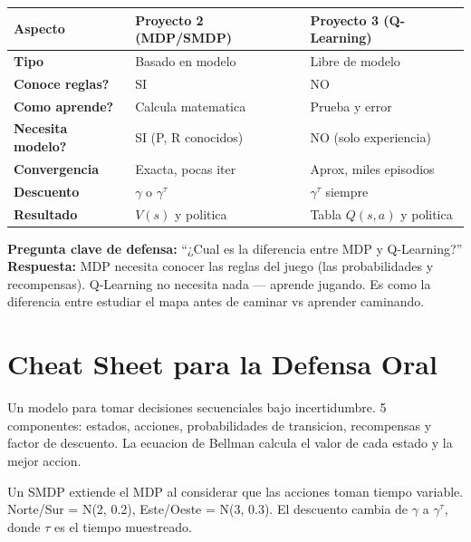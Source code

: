 \documentclass[11pt,a4paper]{article}
\begin{document}
\begin{center}
\begin{tabular}{>{\bfseries}l l l}
\toprule
\rowcolor{tabheader}
Aspecto & Proyecto 2 (MDP/SMDP) & Proyecto 3 (Q-Learning) \\
\midrule
Tipo & Basado en modelo & Libre de modelo \\
Conoce reglas? & SI & NO \\
Como aprende? & Calcula matematica & Prueba y error \\
Necesita modelo? & SI (P, R conocidos) & NO (solo experiencia) \\
Convergencia & Exacta, pocas iter & Aprox, miles episodios \\
Descuento & $\gamma$ o $\gamma^\tau$ & $\gamma^\tau$ siempre \\
Resultado & $V(s)$ y politica & Tabla $Q(s,a)$ y politica \\
\bottomrule
\end{tabular}
\end{center}

\begin{importante}
\textbf{Pregunta clave de defensa:} ``¿Cual es la diferencia entre MDP y Q-Learning?'' \\[6pt]
\textbf{Respuesta:} MDP necesita conocer las reglas del juego (las probabilidades y recompensas). Q-Learning no necesita nada — aprende jugando. Es como la diferencia entre estudiar el mapa antes de caminar vs aprender caminando.
\end{importante}

\newpage

\section{Cheat Sheet para la Defensa Oral}

\begin{pregunta}
Un modelo para tomar decisiones secuenciales bajo incertidumbre. 5 componentes: estados, acciones, probabilidades de transicion, recompensas y factor de descuento. La ecuacion de Bellman calcula el valor de cada estado y la mejor accion.
\end{pregunta}

\begin{pregunta}
Un SMDP extiende el MDP al considerar que las acciones toman tiempo variable. Norte/Sur = N(2, 0.2), Este/Oeste = N(3, 0.3). El descuento cambia de $\gamma$ a $\gamma^\tau$, donde $\tau$ es el tiempo muestreado.
\end{pregunta}
\end{document}
